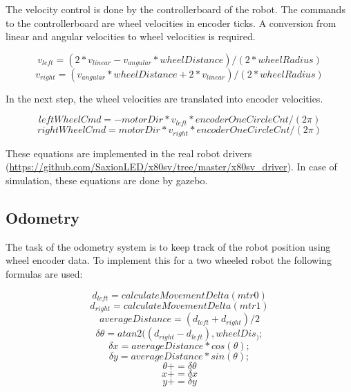 \documentclass[a4paper]{article}
\begin{document}
The velocity control is done by the controllerboard of the robot. The commands to
the controllerboard are wheel velocities in encoder ticks. A conversion from linear
and angular velocities to wheel velocities is required.

\begin{equation}
        v_{left} = (2 * v_{linear} - v_{angular} * wheelDistance) / (2 * wheelRadius)
\end{equation}
\begin{equation}
        v_{right} = (v_{angular} * wheelDistance + 2 * v_{linear}) / (2 * wheelRadius)
\end{equation}

In the next step, the wheel velocities are translated into encoder velocities.

\begin{equation}
  leftWheelCmd = -motorDir * v_{left} * encoderOneCircleCnt / (2 \pi)
\end{equation}
\begin{equation}
 rightWheelCmd = motorDir * v_{right} * encoderOneCircleCnt / (2 \pi)
\end{equation}

These equations are implemented in the real robot drivers (\url{https://github.com/SaxionLED/x80sv/tree/master/x80sv_driver}). In case of simulation, these equations are done by gazebo.

\subsection{Odometry}
The task of the odometry system is to keep track of the robot position using wheel encoder
data. To implement this for a two wheeled robot the following formulas are used:

\begin{equation}
 d_{left} = calculateMovementDelta(mtr0)
\end{equation}
\begin{equation}
 d_{right} = calculateMovementDelta(mtr1)
\end{equation}
\begin{equation}
 averageDistance = (d_{left} + d_{right}) / 2
\end{equation}
\begin{equation}
 \delta \theta = atan2((d_{right} - d_{left}), wheelDis_);
\end{equation}
\begin{equation}
 \delta x = averageDistance * cos(\theta);
\end{equation}
\begin{equation}
 \delta y = averageDistance * sin(\theta);
\end{equation}
\begin{equation}
 \theta += \delta \theta
\end{equation}
\begin{equation}
 x += \delta x
\end{equation}
\begin{equation}
 y += \delta y
\end{equation}
\end{document}

